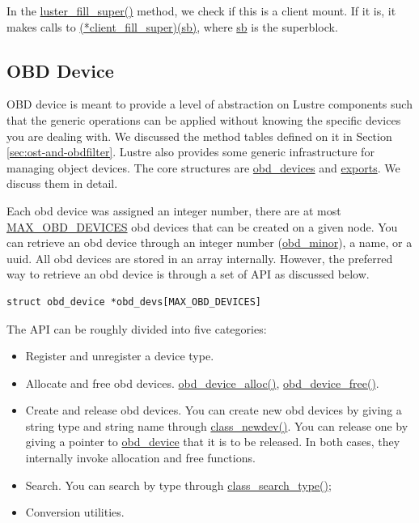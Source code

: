 In the \url{luster_fill_super()} method, we check if this is a client mount.
If it is, it makes calls to \url{(*client_fill_super)(sb)}, where \url{sb} is
the superblock.


\subsection{OBD Device}

OBD device is meant to provide a level of abstraction on Lustre components such
that the generic operations can be applied without knowing the specific devices
you are dealing with. We discussed the method tables defined on it in Section
\ref{sec:ost-and-obdfilter}. Lustre also provides some generic infrastructure
for managing object devices. The core structures are \url{obd_devices} and
\url{exports}. We discuss them in detail.

Each obd device was assigned an integer number, there are at most
\url{MAX_OBD_DEVICES} obd devices that can be created on a given node. You can retrieve an
obd device through an integer number (\url{obd_minor}), a name, or a uuid. All obd
devices are stored in an array internally. However, the preferred way to
retrieve an obd device is through a set of API as discussed below.

\begin{Verbatim}
struct obd_device *obd_devs[MAX_OBD_DEVICES]
\end{Verbatim}

The API can be roughly divided into five categories:

\begin{itemize}

\item Register and unregister a device type.

\item Allocate and free obd devices. \url{obd_device_alloc()},
\url{obd_device_free()}.


\item Create and release obd devices. You can create new obd devices
by giving a string type and string name through \url{class_newdev()}. 
You can release one by giving a pointer to \url{obd_device} that it is to be
released. In both cases, they internally invoke allocation and free
functions.

\item Search. You can search by type through \url{class_search_type()}; 

\item Conversion utilities.

\end{itemize}


